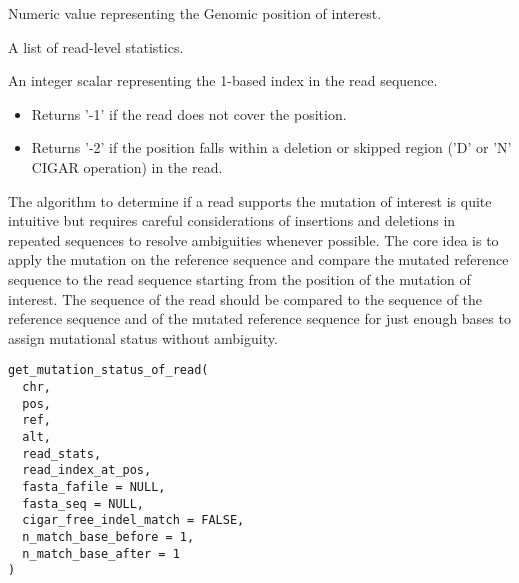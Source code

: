 \documentclass[a4paper]{book}
\begin{document}
%
\begin{Arguments}
\begin{ldescription}
\item[\code{pos}] Numeric value representing the Genomic position of interest.

\item[\code{read\_stats}] A list of read-level statistics.
\end{ldescription}
\end{Arguments}
%
\begin{Value}
An integer scalar representing the 1-based index in the read sequence.
\begin{itemize}

\item{} Returns '-1' if the read does not cover the position.
\item{} Returns '-2' if the position falls within a deletion or skipped
region ('D' or 'N' CIGAR operation) in the read.

\end{itemize}

\end{Value}
%
\begin{Description}
The algorithm to determine if a read supports the mutation of interest is quite intuitive but requires careful
considerations of insertions and deletions in repeated sequences to resolve ambiguities whenever possible. The core
idea is to apply the mutation on the reference sequence and compare the mutated reference sequence to the read
sequence starting from the position of the mutation of interest. The sequence of the read should be compared to the
sequence of the reference sequence and of the mutated reference sequence for just enough bases to assign mutational
status without ambiguity.
\end{Description}
%
\begin{Usage}
\begin{verbatim}
get_mutation_status_of_read(
  chr,
  pos,
  ref,
  alt,
  read_stats,
  read_index_at_pos,
  fasta_fafile = NULL,
  fasta_seq = NULL,
  cigar_free_indel_match = FALSE,
  n_match_base_before = 1,
  n_match_base_after = 1
)
\end{verbatim}
\end{Usage}
%
\end{document}
